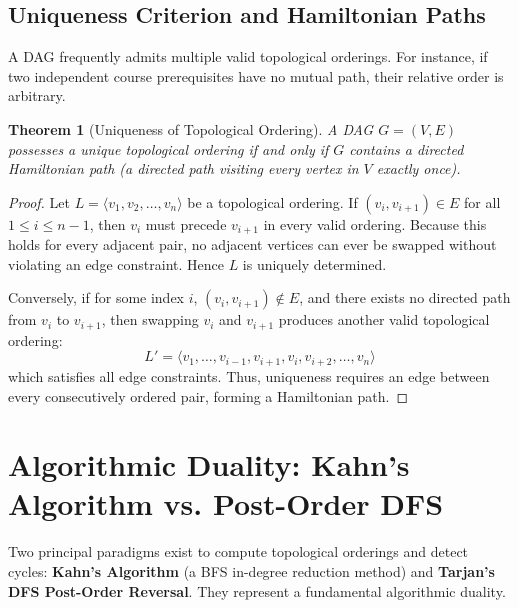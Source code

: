 \documentclass[10pt,journal,compsoc,onecolumn]{IEEEtran}
\newtheorem{theorem}{Theorem}
\begin{document}
\subsection{Uniqueness Criterion and Hamiltonian Paths}
A DAG frequently admits multiple valid topological orderings. For instance, if two independent course prerequisites have no mutual path, their relative order is arbitrary.

\begin{theorem}[Uniqueness of Topological Ordering]
A DAG $G = (V, E)$ possesses a unique topological ordering if and only if $G$ contains a directed Hamiltonian path (a directed path visiting every vertex in $V$ exactly once).
\end{theorem}

\begin{proof}
Let $L = \langle v_1, v_2, \dots, v_n \rangle$ be a topological ordering. If $(v_i, v_{i+1}) \in E$ for all $1 \le i \le n-1$, then $v_i$ must precede $v_{i+1}$ in every valid ordering. Because this holds for every adjacent pair, no adjacent vertices can ever be swapped without violating an edge constraint. Hence $L$ is uniquely determined.

Conversely, if for some index $i$, $(v_i, v_{i+1}) \notin E$, and there exists no directed path from $v_i$ to $v_{i+1}$, then swapping $v_i$ and $v_{i+1}$ produces another valid topological ordering:
\begin{equation}
L' = \langle v_1, \dots, v_{i-1}, v_{i+1}, v_i, v_{i+2}, \dots, v_n \rangle
\end{equation}
which satisfies all edge constraints. Thus, uniqueness requires an edge between every consecutively ordered pair, forming a Hamiltonian path.
\end{proof}

\section{Algorithmic Duality: Kahn's Algorithm vs. Post-Order DFS}
\label{sec:kahn_vs_dfs}

Two principal paradigms exist to compute topological orderings and detect cycles: \textbf{Kahn's Algorithm} (a BFS in-degree reduction method) and \textbf{Tarjan's DFS Post-Order Reversal}. They represent a fundamental algorithmic duality.
\end{document}
